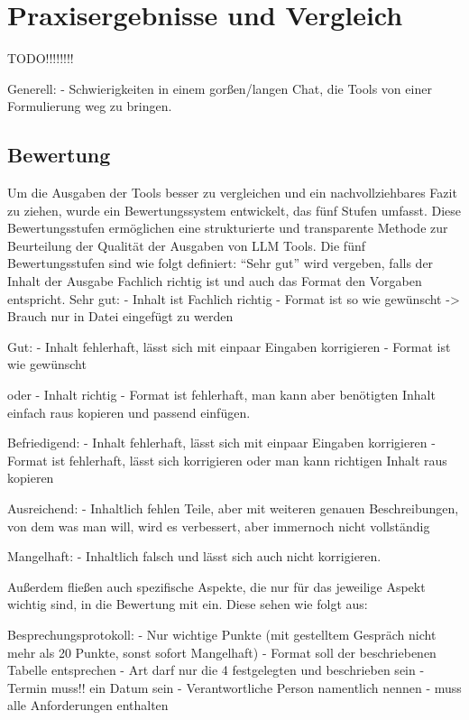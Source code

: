 
\chapter{Praxisergebnisse und Vergleich} 

TODO!!!!!!!!

Generell:
    - Schwierigkeiten in einem gorßen/langen Chat, die Tools von einer Formulierung weg zu bringen. 


\section{Bewertung}  \label{BewertungLLMTools}

Um die Ausgaben der Tools besser zu vergleichen und ein nachvollziehbares Fazit zu ziehen, wurde ein Bewertungssystem 
entwickelt, das fünf Stufen umfasst. Diese Bewertungsstufen ermöglichen eine strukturierte und transparente Methode 
zur Beurteilung der Qualität der Ausgaben von LLM Tools. Die fünf Bewertungsstufen sind wie folgt definiert:
``Sehr gut'' wird vergeben, falls der Inhalt der Ausgabe Fachlich richtig ist und auch das Format den Vorgaben entspricht.
Sehr gut:
- Inhalt ist Fachlich richtig
- Format ist so wie gewünscht
-> Brauch nur in Datei eingefügt zu werden

Gut:
- Inhalt fehlerhaft, lässt sich mit einpaar Eingaben korrigieren
- Format ist wie gewünscht

oder
- Inhalt richtig
- Format ist fehlerhaft, man kann aber benötigten Inhalt einfach raus kopieren und passend einfügen.

Befriedigend:
- Inhalt fehlerhaft, lässt sich mit einpaar Eingaben korrigieren
- Format ist fehlerhaft, lässt sich korrigieren oder man kann richtigen Inhalt raus kopieren

Ausreichend:
- Inhaltlich fehlen Teile, aber mit weiteren genauen Beschreibungen, von dem was man will, wird es verbessert, aber 
immernoch nicht vollständig

Mangelhaft:
- Inhaltlich falsch und lässt sich auch nicht korrigieren.

Außerdem fließen auch spezifische Aspekte, die nur für das jeweilige Aspekt wichtig sind, in die Bewertung mit ein. 
Diese sehen wie folgt aus:

Besprechungsprotokoll:
- Nur wichtige Punkte (mit gestelltem Gespräch nicht mehr als 20 Punkte, sonst sofort Mangelhaft)
- Format soll der beschriebenen Tabelle entsprechen
- Art darf nur die 4 festgelegten und beschrieben sein
- Termin muss!! ein Datum sein
- Verantwortliche Person namentlich nennen
- muss alle Anforderungen enthalten

